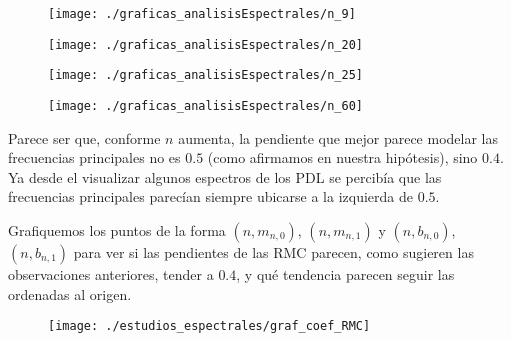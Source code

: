 \begin{figure}[H]
	\centering
	\texttt{[image: ./graficas\_analisisEspectrales/n\_9]} 
\end{figure}	

\begin{figure}[H]
	\centering
	\texttt{[image: ./graficas\_analisisEspectrales/n\_20]} 
\end{figure}

\begin{figure}[H]
	\centering
	\texttt{[image: ./graficas\_analisisEspectrales/n\_25]} 
\end{figure}

\begin{figure}[H]
	\centering
	\texttt{[image: ./graficas\_analisisEspectrales/n\_60]} 
\end{figure}

Parece ser que, conforme $n$ aumenta, la 
pendiente que mejor parece modelar las
frecuencias principales no es
$0.5$ (como afirmamos en nuestra hipótesis), 
sino $0.4$. Ya desde el visualizar algunos espectros
de los PDL se percibía que las frecuencias principales
parecían siempre ubicarse a la izquierda de $0.5$.

Grafiquemos los puntos de la forma
$(n, m_{n,0})$, $(n, m_{n,1})$ y 
$(n, b_{n,0})$, $(n, b_{n,1})$ 
para ver si las pendientes de las RMC parecen, como
sugieren las observaciones anteriores, tender a $0.4$,
y qué tendencia parecen seguir las ordenadas al origen.
\begin{figure}[H]
	\centering
	\texttt{[image: ./estudios\_espectrales/graf\_coef\_RMC]} 
\end{figure}	

